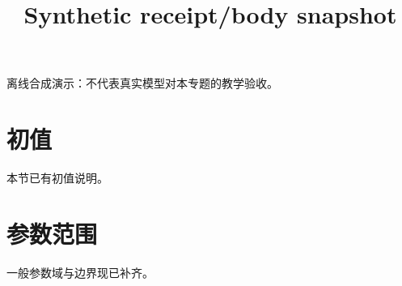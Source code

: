 \documentclass[UTF8,fontset=fandol,11pt]{ctexart}
\title{Synthetic receipt/body snapshot}
\date{}
\begin{document}
\maketitle
\par\noindent 离线合成演示：不代表真实模型对本专题的教学验收。\par
\section{初值}\label{sec:S01}
本节已有初值说明。\par
\section{参数范围}\label{sec:S02}
一般参数域与边界现已补齐。\par
\end{document}
